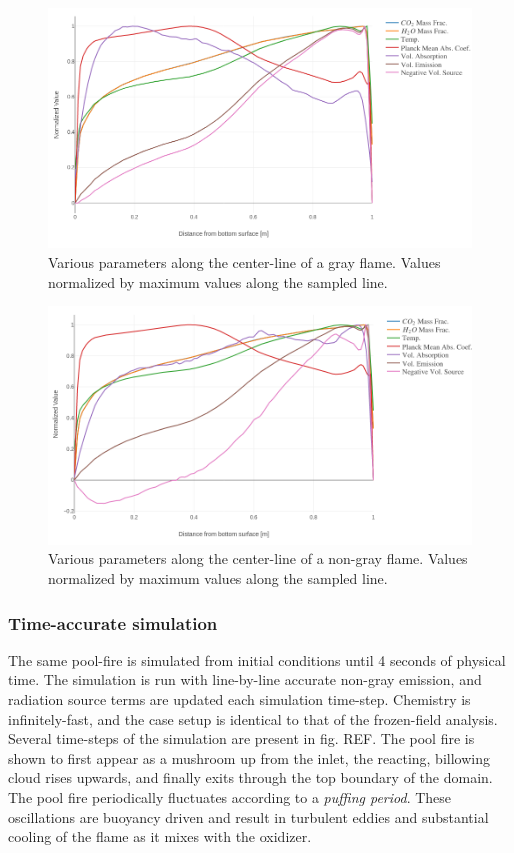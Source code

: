 \begin{figure}[!ht]
\includegraphics[width=\linewidth]{figures/ch4/line_plot.png}
\caption{Various parameters along the center-line of a gray flame. Values normalized by maximum values along the sampled line.}
\label{fig:PoolFire_lineplot}
\end{figure}


\begin{figure}[!ht]
\includegraphics[width=\linewidth]{figures/ch4/line_plot_nongray.png}
\caption{Various parameters along the center-line of a non-gray flame. Values normalized by maximum values along the sampled line.}
\label{fig:PoolFire_lineplot_nongray}
\end{figure}

\subsubsection{Time-accurate simulation}
The same pool-fire is simulated from initial conditions until 4 seconds of physical time.
The simulation is run with line-by-line accurate non-gray emission, and radiation source terms are updated each simulation time-step. Chemistry is infinitely-fast, and the case setup is identical to that of the frozen-field analysis.
Several time-steps of the simulation are present in fig. REF. The pool fire is shown to first appear as a mushroom up from the inlet, the reacting, billowing cloud rises upwards, and finally exits through the top boundary of the domain.
The pool fire periodically fluctuates according to a \textit{puffing period}. These oscillations are buoyancy driven and result in turbulent eddies and substantial cooling of the flame as it mixes with the oxidizer.


